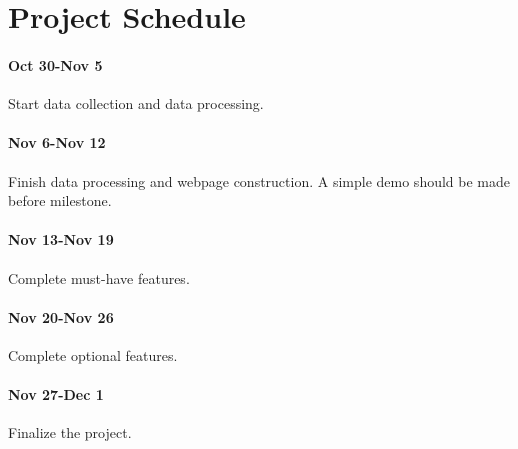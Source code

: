 \documentclass[12pt, fullpage,letterpaper]{article}
\begin{document}
\section{Project Schedule}
\paragraph{Oct 30-Nov 5} Start data collection and data processing.
\paragraph{Nov 6-Nov 12} Finish data processing and webpage construction. A simple demo should be made before milestone.
\paragraph{Nov 13-Nov 19} Complete must-have features.
\paragraph{Nov 20-Nov 26} Complete optional features.
\paragraph{Nov 27-Dec 1} Finalize the project.
\end{document}
